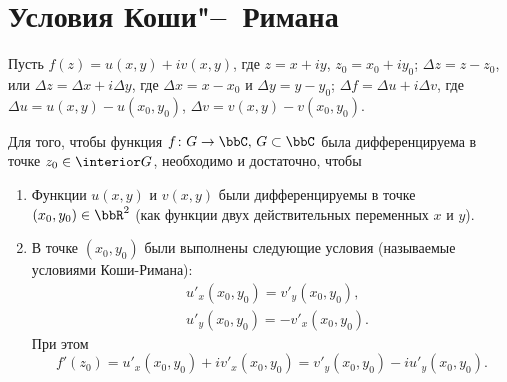 \section{Условия Коши"--~Римана}  
Пусть $f(z)=u(x,y)+iv(x,y)$, где $z=x+iy$, $z_0=x_0+iy_0$; $\Delta z=z-z_0$, или $\Delta z = \Delta x + i\Delta y$, где $\Delta x = x-x_0$ и $\Delta y =y-y_0$; $\Delta f = \Delta u + i\Delta v$, где $\Delta u = u(x,y)-u(x_0,y_0)$,  $\Delta v = v(x,y)-v(x_0,y_0)$. \footnotemark
{}
\begin{thm} 
Для того, чтобы функция $f\colon G  \to \bbC,\, G \subset \bbC$ была дифференцируема в точке $z_0\in \interior G$, необходимо и достаточно, чтобы
\begin{enumerate}
\item
Функции $u(x,y)$ и $v(x,y)$ были дифференцируемы в точке $(x_0,y_0) \in \bbR^2$ (как функции двух действительных переменных $x$ и $y$).
\item
В точке  $(x_0,y_0)$ были выполнены следующие условия (называемые условиями Коши-Римана):
\begin{equation}
\label{exp17}
\begin{split}
&u'_x(x_0,y_0) = v'_y(x_0,y_0), \\ &u'_y(x_0,y_0) = -v'_x(x_0,y_0).
\end{split}
\end{equation}
При этом
\begin{equation}
\label{exp8}
f'(z_0) = u'_x(x_0,y_0) + iv'_x(x_0,y_0)= v'_y(x_0,y_0) -iu'_y(x_0,y_0).
\end{equation}
\end{enumerate}
\end{thm}
